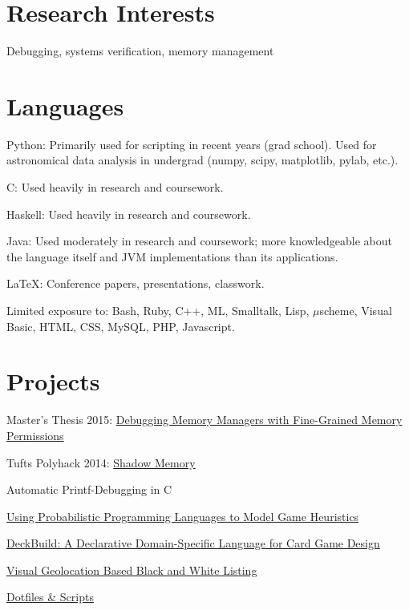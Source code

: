 \documentclass[margin,line]{res}                          %
\newenvironment{list1}{
  \begin{list}{\ding{113}}{%
      \setlength{\itemsep}{0in}
      \setlength{\parsep}{0in} \setlength{\parskip}{0in}
      \setlength{\topsep}{0in} \setlength{\partopsep}{0in}
      \setlength{\leftmargin}{0.17in}}}{\end{list}}
\begin{document}
\begin{resume}
\section{\sc Research Interests}
Debugging, systems verification, memory management

\section{\sc Languages}
\begin{list1}
\item[] Python: Primarily used for scripting in recent years (grad school). Used for astronomical
        data analysis in undergrad (numpy, scipy, matplotlib, pylab, etc.). \\
\item[] C: Used heavily in research and coursework. \\
\item[] Haskell: Used heavily in research and coursework. \\
\item[] Java: Used moderately in research and coursework; more knowledgeable about the language
        itself and JVM implementations than its applications. \\
\item[] \LaTeX: Conference papers, presentations, classwork. \\
\item[] Limited exposure to: Bash, Ruby, C++, ML, Smalltalk, Lisp, $\mu$scheme, Visual Basic,
        HTML, CSS, MySQL, PHP, Javascript.
\end{list1}

\section{\sc Projects}
\begin{list1}
\item[] Master's Thesis 2015: \href{https://www.eecs.tufts.edu/~karl/masters/}{Debugging Memory Managers with Fine-Grained Memory Permissions} \\
\item[] Tufts Polyhack 2014: \href{https://github.com/cronburg/shadow-memory/}{Shadow Memory} \\
\item[] Automatic Printf-Debugging in C \\
\item[] \href{https://www.eecs.tufts.edu/~karl/ppl/}{Using Probabilistic Programming Languages to Model Game Heuristics} \\
\item[] \href{https://www.eecs.tufts.edu/~karl/pld/}{DeckBuild: A Declarative Domain-Specific Language for Card Game Design} \\
\item[] \href{https://www.eecs.tufts.edu/~karl/security/paper.pdf}{Visual Geolocation Based Black and White Listing} \\
\item[] \href{https://github.com/cronburg/scripts}{Dotfiles \& Scripts} \\


\end{list1}
\end{resume}
\end{document}

